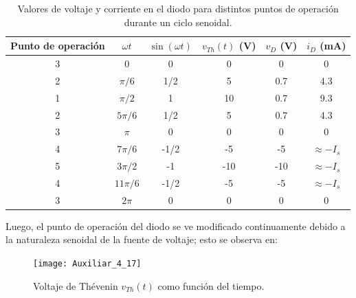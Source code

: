 \documentclass[
  11pt,
  letterpaper,
   addpoints,
  ]{exam}
\begin{document}
\begin{questions}
\begin{solution}
\begin{table}[H]
  \centering
  \begin{tabular}{c c c c c c}
    \hline
    Punto de operación & $\omega t$ & $\sin(\omega t)$ & $v_{Th}(t)$ (V) & $v_D$ (V) & $i_D$ (mA) \\
    \hline
    3 & 0 & 0 & 0 & 0 & 0 \\
    2 & $\pi/6$ & 1/2 & 5 & 0.7 & 4.3 \\
    1 & $\pi/2$ & 1 & 10 & 0.7 & 9.3 \\
    2 & $5\pi/6$ & 1/2 & 5 & 0.7 & 4.3 \\
    3 & $\pi$ & 0 & 0 & 0 & 0 \\
    4 & $7\pi/6$ & -1/2 & -5 & -5 & $\approx -I_s$ \\
    5 & $3\pi/2$ & -1 & -10 & -10 & $\approx -I_s$ \\
    4 & $11\pi/6$ & -1/2 & -5 & -5 & $\approx -I_s$ \\
    3 & $2\pi$ & 0 & 0 & 0 & 0 \\
    \hline
  \end{tabular}
  \caption{Valores de voltaje y corriente en el diodo para distintos puntos de operación durante un ciclo senoidal.}
  \label{tab:diodo-operacion}
\end{table}
Luego, el punto de operación del diodo se ve modificado continuamente debido a la naturaleza senoidal de la fuente de voltaje; esto se observa en:
\begin{figure}[H]
    \centering
\texttt{[image: Auxiliar\_4\_17]}
    \caption{Voltaje de Thévenin $v_{Th}(t)$ como función del tiempo.}
    \label{fig:voltaje-th}
\end{figure}


\end{solution}
\end{questions}
\end{document}
